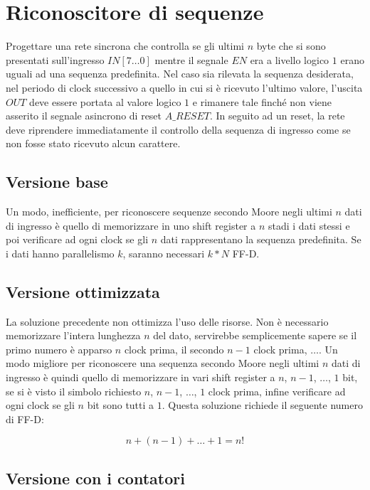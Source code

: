 \documentclass{article}
\begin{document}
\section{Riconoscitore di sequenze}

Progettare una rete sincrona che controlla se gli ultimi $n$ byte che si sono presentati sull'ingresso $IN[7 \dots 0]$ mentre il segnale $EN$ era a livello logico $1$ erano uguali ad una sequenza predefinita.
Nel caso sia rilevata la sequenza desiderata, nel periodo di clock successivo a quello in cui si è ricevuto l'ultimo valore, l'uscita $OUT$ deve essere portata al valore logico $1$ e rimanere tale finché non viene asserito il segnale asincrono di reset $A\_RESET$.
In seguito ad un reset, la rete deve riprendere immediatamente il controllo della sequenza di ingresso come se non fosse stato ricevuto alcun carattere.

\subsection{Versione base}

Un modo, inefficiente, per riconoscere sequenze secondo Moore negli ultimi $n$ dati di ingresso è quello di memorizzare in uno shift register a $n$ stadi i dati stessi e poi verificare ad ogni clock se gli $n$ dati rappresentano la sequenza predefinita.
Se i dati hanno parallelismo $k$, saranno necessari $k * N$ FF-D.

\subsection{Versione ottimizzata}

La soluzione precedente non ottimizza l'uso delle risorse.
Non è necessario memorizzare l'intera lunghezza $n$ del dato, servirebbe semplicemente sapere se il primo numero è apparso $n$ clock prima, il secondo $n-1$ clock prima, $\dots$.
Un modo migliore per riconoscere una sequenza secondo Moore negli ultimi $n$ dati di ingresso è quindi quello di memorizzare in vari shift register a $n$, $n-1$, $\dots$, $1$ bit, se si è visto il simbolo richiesto $n$, $n-1$, $\dots$, $1$ clock prima, infine verificare ad ogni clock se gli $n$ bit sono tutti a $1$.
Questa soluzione richiede il seguente numero di FF-D:

$$
n + (n-1) + \dots + 1 = n!
$$

\subsection{Versione con i contatori}
\end{document}
